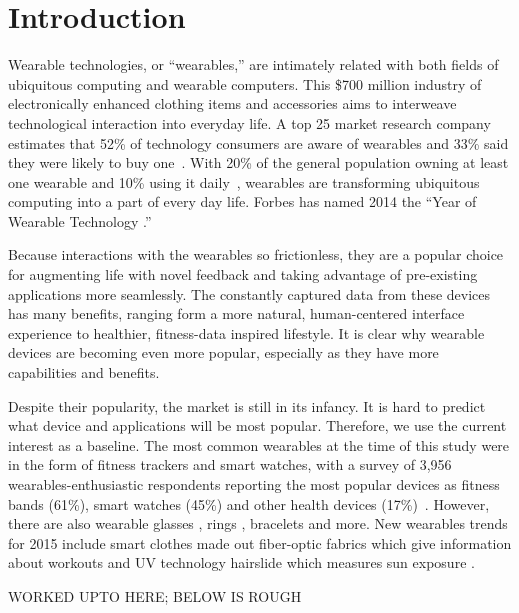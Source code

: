 
\section{Introduction}

Wearable technologies, or ``wearables,'' are intimately related with both fields of ubiquitous computing and wearable computers. This \$700 million industry \cite{cmo} of electronically enhanced clothing items and accessories aims to interweave technological interaction into everyday life. A top 25 market research company estimates that 52\% of technology consumers are aware of wearables and 33\% said they were likely to buy one~\cite{NPD}. With 20\% of the general population owning at least one wearable and 10\% using it daily~\cite{WearableStatNews}, wearables are transforming ubiquitous computing into a part of every day life. Forbes has named 2014 the ``Year of Wearable Technology \cite{Forbes}.''

Because interactions with the wearables so frictionless, they are a popular choice for augmenting life with novel feedback and taking advantage of pre-existing applications more seamlessly. The constantly captured data from these devices has many benefits, ranging form a more natural, human-centered interface experience to healthier, fitness-data inspired lifestyle. It is clear why wearable devices are becoming even more popular, especially as they have more capabilities and benefits. 

Despite their popularity, the market is still in its infancy. It is hard to predict what device and applications will be most popular. Therefore, we use the current interest as a baseline. The most common wearables at the time of this study were in the form of fitness trackers and smart watches, with a survey of 3,956 wearables-enthusiastic respondents reporting the most popular devices as fitness bands (61\%), smart watches (45\%) and other health devices (17\%)~\cite{Nilsen}.  However, there are also wearable glasses \cite{ 2_google_2014, 3_sony_global_2014}, rings \cite{4_ringly_2014}, bracelets \cite{5_intel_2014} and more. New wearables trends for 2015 include smart clothes made out fiber-optic fabrics which give information about workouts and UV technology hairslide which measures sun exposure \cite{1_digital_trends_2014, 2_arthur_2014}.


{\color{red} WORKED UPTO HERE; BELOW IS ROUGH}

